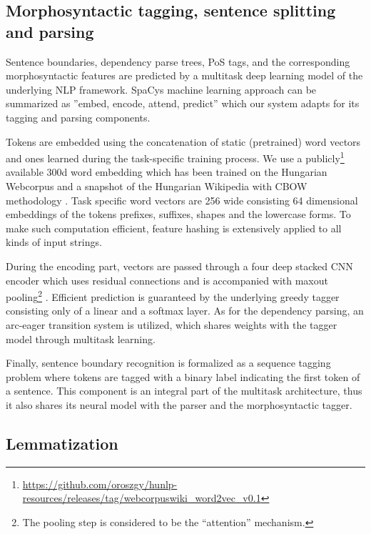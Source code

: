 \documentclass{llncs}
\begin{document}
\subsection{Morphosyntactic tagging, sentence splitting and parsing}
\label{sec:tagging}

Sentence boundaries, dependency parse trees, PoS tags, and the corresponding morphosyntactic features are predicted by a multitask deep learning model of the underlying NLP framework.  SpaCy\textquotesingle s machine learning approach can be summarized as ''embed, encode, attend, predict''  \citep{spacy-neural-model} which our system adapts for its tagging and parsing components.

Tokens are embedded using the concatenation of static (pretrained) word vectors and ones learned during the task-specific training process. 
We use a publicly\footnote{\url{https://github.com/oroszgy/hunlp-resources/releases/tag/webcorpuswiki_word2vec_v0.1}} available 300d word embedding which has been trained on the Hungarian Webcorpus \citep{HunWebCorpus} and a snapshot of the Hungarian Wikipedia with CBOW methodology \citep{word2vec}. 
Task specific word vectors are 256 wide consisting 64 dimensional embeddings of the tokens\textquotesingle{} prefixes, suffixes, shapes and the lowercase forms. To make such computation efficient, feature hashing is extensively applied to all kinds of input strings. 

During the encoding part, vectors are passed through a four deep stacked CNN encoder \citep{cnn} which uses residual connections and is accompanied with maxout pooling\footnote{The pooling step is considered to be the “attention” mechanism.} \citep{spacy-parser2}. 
Efficient prediction is guaranteed by the underlying greedy tagger consisting only of a linear and a softmax layer. As for the dependency parsing, an arc-eager transition system \citep{spacy-parser} is utilized, which shares weights with the tagger model through multitask learning. 

Finally, sentence boundary recognition is formalized as a sequence tagging problem where tokens are tagged with a binary label indicating the first token of a sentence. This component is an integral part of the multitask architecture, thus it also shares its neural model with the parser and the morphosyntactic tagger.

\subsection{Lemmatization}
\end{document}
